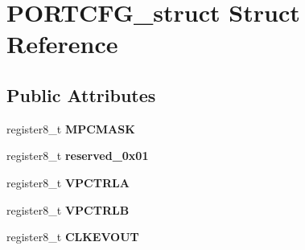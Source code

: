 \hypertarget{struct_p_o_r_t_c_f_g__struct}{}\section{P\+O\+R\+T\+C\+F\+G\+\_\+struct Struct Reference}
\label{struct_p_o_r_t_c_f_g__struct}
\subsection*{Public Attributes}
\begin{DoxyCompactItemize}
\item 
register8\+\_\+t {\bfseries M\+P\+C\+M\+A\+SK}\hypertarget{struct_p_o_r_t_c_f_g__struct_a18137f5cc66037f33b8b2d9fbd93125a}{}\label{struct_p_o_r_t_c_f_g__struct_a18137f5cc66037f33b8b2d9fbd93125a}

\item 
register8\+\_\+t {\bfseries reserved\+\_\+0x01}\hypertarget{struct_p_o_r_t_c_f_g__struct_a18f13a9d6b6a644d548e6008f876e327}{}\label{struct_p_o_r_t_c_f_g__struct_a18f13a9d6b6a644d548e6008f876e327}

\item 
register8\+\_\+t {\bfseries V\+P\+C\+T\+R\+LA}\hypertarget{struct_p_o_r_t_c_f_g__struct_a6fac78b86e90318e180ad682e84a3516}{}\label{struct_p_o_r_t_c_f_g__struct_a6fac78b86e90318e180ad682e84a3516}

\item 
register8\+\_\+t {\bfseries V\+P\+C\+T\+R\+LB}\hypertarget{struct_p_o_r_t_c_f_g__struct_a8819c9ec352e390fe1c9b28a6feb7d2e}{}\label{struct_p_o_r_t_c_f_g__struct_a8819c9ec352e390fe1c9b28a6feb7d2e}

\item 
register8\+\_\+t {\bfseries C\+L\+K\+E\+V\+O\+UT}\hypertarget{struct_p_o_r_t_c_f_g__struct_ad5989612713da42329d0a3e4b26c692e}{}\label{struct_p_o_r_t_c_f_g__struct_ad5989612713da42329d0a3e4b26c692e}

\end{DoxyCompactItemize}


